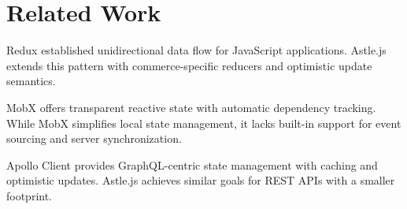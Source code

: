 \section{Related Work}


Redux \cite{redux2015} established unidirectional data flow for JavaScript applications. Astle.js extends this pattern with commerce-specific reducers and optimistic update semantics.

MobX \cite{mobx2016} offers transparent reactive state with automatic dependency tracking. While MobX simplifies local state management, it lacks built-in support for event sourcing and server synchronization.

Apollo Client \cite{apollo2016} provides GraphQL-centric state management with caching and optimistic updates. Astle.js achieves similar goals for REST APIs with a smaller footprint.

